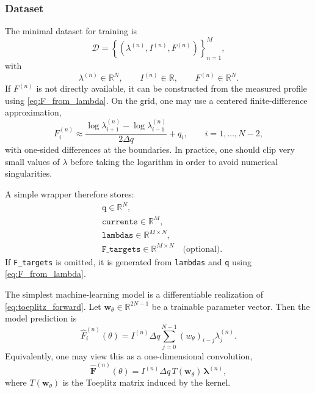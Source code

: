 \documentclass[11pt,a4paper]{article}
\begin{document}
\begin{sloppypar}
\subsubsection{Dataset}
The minimal dataset for training is
\begin{equation}
\mathcal{D} = \left\{\left(\lambda^{(n)}, I^{(n)}, F^{(n)}\right)\right\}_{n=1}^{M},
\end{equation}
with
\begin{equation}
\lambda^{(n)}\in\mathbb{R}^{N},
\qquad
I^{(n)}\in\mathbb{R},
\qquad
F^{(n)}\in\mathbb{R}^{N}.
\end{equation}
If $F^{(n)}$ is not directly available, it can be constructed from the measured profile using \eqref{eq:F_from_lambda}. On the grid, one may use a centered finite-difference approximation,
\begin{equation}
F^{(n)}_i \approx \frac{\log\lambda^{(n)}_{i+1}-\log\lambda^{(n)}_{i-1}}{2\Delta q}+q_i,
\qquad i=1,\dots,N-2,
\end{equation}
with one-sided differences at the boundaries. In practice, one should clip very small values of $\lambda$ before taking the logarithm in order to avoid numerical singularities.

A simple wrapper therefore stores:
\begin{align}
&\texttt{q} \in \mathbb{R}^{N}, \\
&\texttt{currents} \in \mathbb{R}^{M}, \\
&\texttt{lambdas} \in \mathbb{R}^{M\times N}, \\
&\texttt{F\_targets} \in \mathbb{R}^{M\times N} \quad \text{(optional)}.
\end{align}
If \texttt{F\_targets} is omitted, it is generated from \texttt{lambdas} and \texttt{q} using \eqref{eq:F_from_lambda}.


The simplest machine-learning model is a differentiable realization of \eqref{eq:toeplitz_forward}. Let $\bm{w}_{\theta}\in\mathbb{R}^{2N-1}$ be a trainable parameter vector. Then the model prediction is
\begin{equation}
\widehat{F}^{(n)}_i(\theta) = I^{(n)}\Delta q \sum_{j=0}^{N-1} (w_{\theta})_{i-j}\lambda^{(n)}_j.
\label{eq:model_prediction}
\end{equation}
Equivalently, one may view this as a one-dimensional convolution,
\begin{equation}
\widehat{\bm{F}}^{(n)}(\theta)=I^{(n)}\Delta q\,T(\bm{w}_{\theta})\,\bm{\lambda}^{(n)},
\end{equation}
where $T(\bm{w}_{\theta})$ is the Toeplitz matrix induced by the kernel.


\end{sloppypar}
\end{document}
